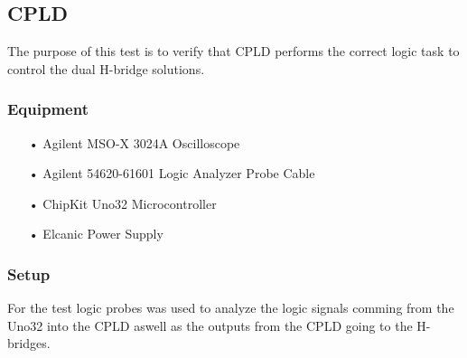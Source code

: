 \subsection{CPLD}
The purpose of this test is to verify that CPLD performs the correct logic task to control the dual H-bridge solutions.
\subsubsection{Equipment}
\begin{enumerate}
	\item[•]Agilent MSO-X 3024A Oscilloscope
	\item[•]Agilent 54620-61601 Logic Analyzer Probe Cable
	\item[•]ChipKit Uno32 Microcontroller
	\item[•]Elcanic Power Supply
\end{enumerate}

\subsubsection{Setup}
For the test logic probes was used to analyze the logic signals comming from the Uno32 into the CPLD aswell as the outputs from the CPLD going to the H-bridges.

